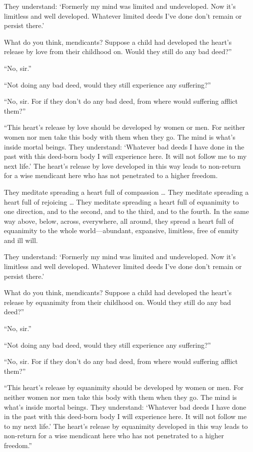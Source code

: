 \documentclass[12pt,openany]{book}%
\begin{document}
They understand: ‘Formerly my mind was limited and undeveloped. Now it’s limitless and well developed. Whatever limited deeds I’ve done don’t remain or persist there.’ 

What do you think, mendicants? Suppose a child had developed the heart’s release by love from their childhood on. Would they still do any bad deed?” 

“No, sir.” 

“Not doing any bad deed, would they still experience any suffering?” 

“No, sir. For if they don’t do any bad deed, from where would suffering afflict them?” 

“This heart’s release by love should be developed by women or men. For neither women nor men take this body with them when they go. The mind is what’s inside mortal beings. They understand: ‘Whatever bad deeds I have done in the past with this deed-born body I will experience here. It will not follow me to my next life.’ The heart’s release by love developed in this way leads to non-return for a wise mendicant here who has not penetrated to a higher freedom. 

They meditate spreading a heart full of compassion … They meditate spreading a heart full of rejoicing … They meditate spreading a heart full of equanimity to one direction, and to the second, and to the third, and to the fourth. In the same way above, below, across, everywhere, all around, they spread a heart full of equanimity to the whole world—abundant, expansive, limitless, free of enmity and ill will. 

They understand: ‘Formerly my mind was limited and undeveloped. Now it’s limitless and well developed. Whatever limited deeds I’ve done don’t remain or persist there.’ 

What do you think, mendicants? Suppose a child had developed the heart’s release by equanimity from their childhood on. Would they still do any bad deed?” 

“No, sir.” 

“Not doing any bad deed, would they still experience any suffering?” 

“No, sir. For if they don’t do any bad deed, from where would suffering afflict them?” 

“This heart’s release by equanimity should be developed by women or men. For neither women nor men take this body with them when they go. The mind is what’s inside mortal beings. They understand: ‘Whatever bad deeds I have done in the past with this deed-born body I will experience here. It will not follow me to my next life.’ The heart’s release by equanimity developed in this way leads to non-return for a wise mendicant here who has not penetrated to a higher freedom.” 
\end{document}
